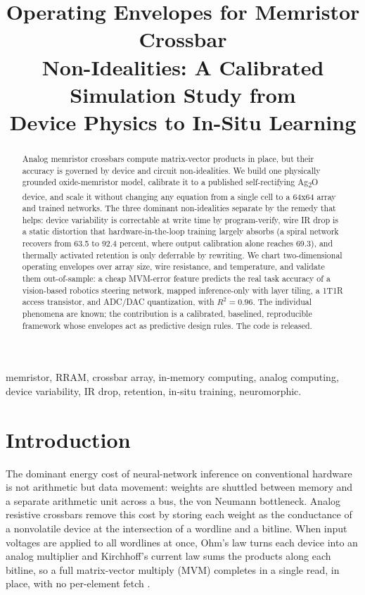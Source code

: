 \documentclass[conference]{IEEEtran}
\begin{document}
\title{Operating Envelopes for Memristor Crossbar\\
Non-Idealities: A Calibrated Simulation Study from\\
Device Physics to In-Situ Learning}

\author{
}

\maketitle

\begin{abstract}
Analog memristor crossbars compute matrix-vector products in place, but their
accuracy is governed by device and circuit non-idealities. We build one
physically grounded oxide-memristor model, calibrate it to a published
self-rectifying Ag\textsubscript{2}O device, and scale it without changing any
equation from a single cell to a 64x64 array and trained networks. The three
dominant non-idealities separate by the remedy that helps: device variability is
correctable at write time by program-verify, wire IR drop is a static distortion
that hardware-in-the-loop training largely absorbs (a spiral network recovers
from 63.5 to 92.4 percent, where output calibration alone reaches 69.3), and
thermally activated retention is only deferrable by rewriting. We chart
two-dimensional operating envelopes over array size, wire resistance, and
temperature, and validate them out-of-sample: a cheap MVM-error feature predicts
the real task accuracy of a vision-based robotics steering network, mapped
inference-only with layer tiling, a 1T1R access transistor, and ADC/DAC
quantization, with $R^2 = 0.96$. The individual phenomena are known; the
contribution is a calibrated, baselined, reproducible framework whose envelopes
act as predictive design rules. The code is released.
\end{abstract}

\begin{IEEEkeywords}
memristor, RRAM, crossbar array, in-memory computing, analog computing, device
variability, IR drop, retention, in-situ training, neuromorphic.
\end{IEEEkeywords}

\section{Introduction}
The dominant energy cost of neural-network inference on conventional hardware is
not arithmetic but data movement: weights are shuttled between memory and a
separate arithmetic unit across a bus, the von Neumann bottleneck. Analog
resistive crossbars remove this cost by storing each weight as the conductance
of a nonvolatile device at the intersection of a wordline and a bitline. When
input voltages are applied to all wordlines at once, Ohm's law turns each device
into an analog multiplier and Kirchhoff's current law sums the products along
each bitline, so a full matrix-vector multiply (MVM) completes in a single read,
in place, with no per-element fetch \cite{ielmini2018, yu2018}.
\end{document}
